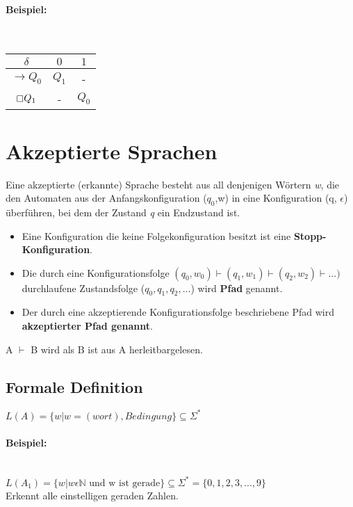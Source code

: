 \paragraph{Beispiel:}\mbox{} \\

\begin{tabular}{|c|c|c|}
\hline 
$\delta$ & $0$ & $1$\tabularnewline
\hline 
\hline 
$\rightarrow Q_{0}$ & $Q_{1}$ & -\tabularnewline
\hline 
$\boxempty Q_{1}$ & - & $Q_{0}$\tabularnewline
\hline 
\end{tabular}

\section{Akzeptierte Sprachen}

Eine akzeptierte (erkannte) Sprache besteht aus all denjenigen Wörtern \textit{w}, die den Automaten aus der Anfangskonfiguration ($q_0$,w) in eine Konfiguration (q, $\epsilon$) überführen, bei dem der Zustand \textit{q} ein Endzustand ist.

\begin{itemize}
	\item Eine Konfiguration die keine Folgekonfiguration besitzt ist eine \textbf{Stopp-Konfiguration}.
	\item Die durch eine Konfigurationsfolge $(q_0,w_0) \vdash (q_1, w_1) \vdash (q_2, w_2) \vdash...)$ durchlaufene Zustandsfolge ($q_0,q_1,q_2,...$) wird \textbf{Pfad} genannt.
	\item Der durch eine akzeptierende Konfigurationsfolge beschriebene Pfad wird \textbf{akzeptierter Pfad genannt}.
\end{itemize}


A $\vdash$ B wird als \glqq B ist aus A herleitbar\grqq gelesen.

\subsection{Formale Definition}

$L(A) = \{w|w = (wort), Bedingung\} \subseteq \Sigma^*$

\paragraph{Beispiel:}\mbox{} \\

$L(A_1) = \{w|w \epsilon \mathbb{N} \textrm{ und w ist gerade} \} \subseteq \Sigma^* = \{0,1,2,3,...,9\}$\\
Erkennt alle einstelligen geraden Zahlen.\\


